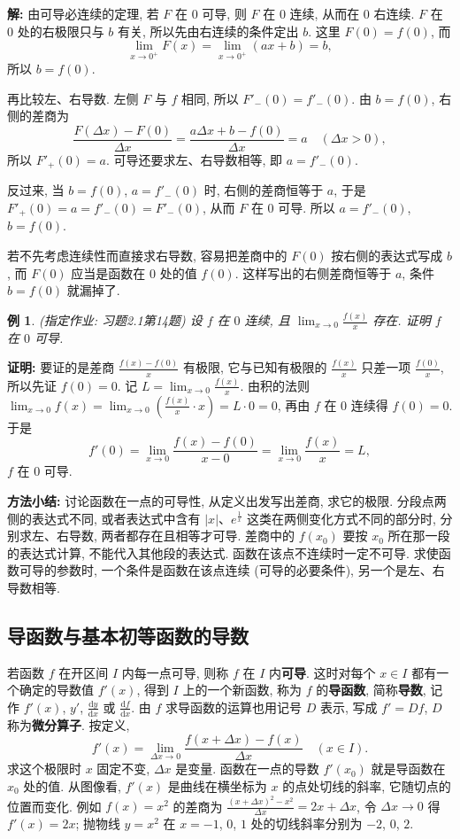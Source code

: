 \documentclass[UTF8,openany]{ctexbook}
\theoremstyle{chinesetextbook}
\newtheorem{example}{例}[section]
\newenvironment{cnproof}{\par\indent\textbf{证明:} \ignorespaces}{\par}
\newenvironment{cnsolution}{\par\indent\textbf{解:} \ignorespaces}{\par}
\newcommand{\dd}{\mathrm d}
\begin{document}
\begin{cnsolution}
由可导必连续的定理, 若 $F$ 在 $0$ 可导, 则 $F$ 在 $0$ 连续, 从而在 $0$ 右连续. $F$ 在 $0$ 处的右极限只与 $b$ 有关, 所以先由右连续的条件定出 $b$. 这里 $F(0)=f(0)$, 而
\[
\lim_{x\to0^+}F(x)=\lim_{x\to0^+}(ax+b)=b,
\]
所以 $b=f(0)$.

再比较左、右导数. 左侧 $F$ 与 $f$ 相同, 所以 $F'_-(0)=f'_-(0)$. 由 $b=f(0)$, 右侧的差商为
\[
\frac{F(\Delta x)-F(0)}{\Delta x}=\frac{a\Delta x+b-f(0)}{\Delta x}=a\quad(\Delta x>0),
\]
所以 $F'_+(0)=a$. 可导还要求左、右导数相等, 即 $a=f'_-(0)$.

反过来, 当 $b=f(0)$, $a=f'_-(0)$ 时, 右侧的差商恒等于 $a$, 于是 $F'_+(0)=a=f'_-(0)=F'_-(0)$, 从而 $F$ 在 $0$ 可导. 所以 $a=f'_-(0)$, $b=f(0)$.
\end{cnsolution}
若不先考虑连续性而直接求右导数, 容易把差商中的 $F(0)$ 按右侧的表达式写成 $b$, 而 $F(0)$ 应当是函数在 $0$ 处的值 $f(0)$. 这样写出的右侧差商恒等于 $a$, 条件 $b=f(0)$ 就漏掉了.
\begin{example}\label{ex:c2-h1-14}
\textnormal{(指定作业: 习题2.1第14题)} 设 $f$ 在 $0$ 连续, 且 $\displaystyle\lim_{x\to0}\frac{f(x)}x$ 存在. 证明 $f$ 在 $0$ 可导.
\end{example}
\begin{cnproof}
要证的是差商 $\displaystyle\frac{f(x)-f(0)}x$ 有极限, 它与已知有极限的 $\displaystyle\frac{f(x)}x$ 只差一项 $\displaystyle\frac{f(0)}x$, 所以先证 $f(0)=0$. 记 $\displaystyle L=\lim_{x\to0}\frac{f(x)}x$. 由积的法则 $\displaystyle\lim_{x\to0}f(x)=\lim_{x\to0}\left(\frac{f(x)}x\cdot x\right)=L\cdot0=0$, 再由 $f$ 在 $0$ 连续得 $f(0)=0$. 于是
\[
f'(0)=\lim_{x\to0}\frac{f(x)-f(0)}{x-0}=\lim_{x\to0}\frac{f(x)}x=L,
\]
$f$ 在 $0$ 可导.
\end{cnproof}
\par\indent\textbf{方法小结:} 讨论函数在一点的可导性, 从定义出发写出差商, 求它的极限. 分段点两侧的表达式不同, 或者表达式中含有 $|x|$、$e^{\frac1x}$ 这类在两侧变化方式不同的部分时, 分别求左、右导数, 两者都存在且相等才可导. 差商中的 $f(x_0)$ 要按 $x_0$ 所在那一段的表达式计算, 不能代入其他段的表达式. 函数在该点不连续时一定不可导. 求使函数可导的参数时, 一个条件是函数在该点连续 (可导的必要条件), 另一个是左、右导数相等.
\subsection{导函数与基本初等函数的导数}
若函数 $f$ 在开区间 $I$ 内每一点可导, 则称 $f$ 在 $I$ 内\textbf{可导}. 这时对每个 $x\in I$ 都有一个确定的导数值 $f'(x)$, 得到 $I$ 上的一个新函数, 称为 $f$ 的\textbf{导函数}, 简称\textbf{导数}, 记作 $f'(x)$, $y'$, $\displaystyle\frac{\dd y}{\dd x}$ 或 $\displaystyle\frac{\dd f}{\dd x}$. 由 $f$ 求导函数的运算也用记号 $D$ 表示, 写成 $f'=Df$, $D$ 称为\textbf{微分算子}. 按定义,
\[
f'(x)=\lim_{\Delta x\to0}\frac{f(x+\Delta x)-f(x)}{\Delta x}\quad(x\in I).
\]
求这个极限时 $x$ 固定不变, $\Delta x$ 是变量. 函数在一点的导数 $f'(x_0)$ 就是导函数在 $x_0$ 处的值. 从图像看, $f'(x)$ 是曲线在横坐标为 $x$ 的点处切线的斜率, 它随切点的位置而变化. 例如 $f(x)=x^2$ 的差商为 $\displaystyle\frac{(x+\Delta x)^2-x^2}{\Delta x}=2x+\Delta x$, 令 $\Delta x\to0$ 得 $f'(x)=2x$; 抛物线 $y=x^2$ 在 $x=-1$, $0$, $1$ 处的切线斜率分别为 $-2$, $0$, $2$.
\end{document}
